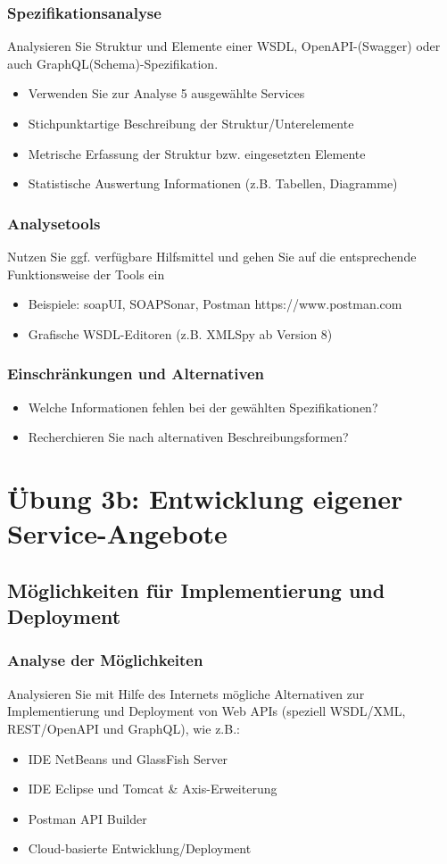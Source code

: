 \documentclass[notitlepage, hidelinks]{article}
\begin{document}
\subsubsection{Spezifikationsanalyse}
Analysieren Sie Struktur und Elemente einer WSDL, OpenAPI-(Swagger) oder auch GraphQL(Schema)-Spezifikation.
\begin{itemize}
\item Verwenden Sie zur Analyse 5 ausgewählte Services
\item Stichpunktartige Beschreibung der Struktur/Unterelemente
\item Metrische Erfassung der Struktur bzw. eingesetzten Elemente
\item Statistische Auswertung Informationen (z.B. Tabellen, Diagramme)
\end{itemize}

\subsubsection{Analysetools}
Nutzen Sie ggf. verfügbare Hilfsmittel und gehen Sie auf die entsprechende Funktionsweise der Tools ein
\begin{itemize}
\item Beispiele: soapUI, SOAPSonar, Postman https://www.postman.com
\item Grafische WSDL-Editoren (z.B. XMLSpy ab Version 8)
\end{itemize}

\subsubsection{Einschränkungen und Alternativen}
\begin{itemize}
\item Welche Informationen fehlen bei der gewählten Spezifikationen?
\item Recherchieren Sie nach alternativen Beschreibungsformen?
\end{itemize}


\newpage
\section{Übung 3b: Entwicklung eigener Service-Angebote}
\subsection{Möglichkeiten für Implementierung und Deployment}
\subsubsection{Analyse der Möglichkeiten}
Analysieren Sie mit Hilfe des Internets mögliche Alternativen zur Implementierung und Deployment von Web APIs (speziell WSDL/XML, REST/OpenAPI und GraphQL), wie z.B.:
\begin{itemize}
\item IDE NetBeans und GlassFish Server
\item IDE Eclipse und Tomcat \& Axis-Erweiterung
\item Postman API Builder
\item Cloud-basierte Entwicklung/Deployment
\end{itemize}
\end{document}
